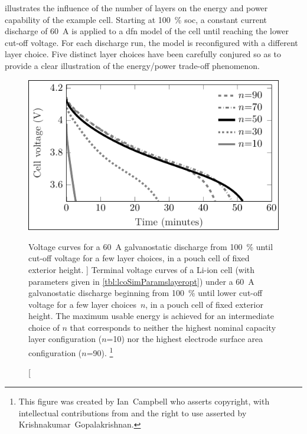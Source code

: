  illustrates  the influence  of the  number of
layers  on the  energy and  power capability  of the  example cell.  Starting at
\SI{100}{\percent} \gls{soc},  a constant current discharge  of \SI{60}{\ampere}
is applied  to a \gls{dfn}  model of the cell  until reaching the  lower cut-off
voltage. For  each discharge  run, the  model is  reconfigured with  a different
layer choice. Five distinct layer choices  have been carefully conjured so as to
provide a clear illustration of the energy/power trade-off phenomenon.

\begin{figure}[!bp]
    \begin{minipage}[t]{\textwidth}
        \centering
        \includegraphics[trim=4 4 2 4,clip]{fig_CC_discharge_curves.pdf}
        \captionsetup{labelsep=note}
        \caption
        [%
        Voltage curves for a \SI{60}{\ampere} galvanostatic discharge from
        \SI{100}{\percent}  until cut-off voltage for a few layer
        choices, in a pouch cell of fixed exterior height.
        ]%
        {%
            Terminal voltage curves of a Li-ion cell (with parameters
            given in \cref{tbl:lcoSimParamslayeropt}) under a \SI{60}{\ampere}
            galvanostatic discharge beginning from \SI{100}{\percent}
             until lower cut-off voltage for a few layer
            choices~$n$, in a pouch cell of fixed exterior height. The maximum
            usable energy is achieved for an intermediate choice of $n$
            that corresponds to neither the highest nominal capacity layer
            configuration ($n$=\num{10}) nor the highest electrode surface area
            configuration ($n$=\num{90}).
        }%
        \label{fig:fig_CC_discharge_curves}
        \mpfootnotes[1]
        \footnote{This figure was created by \mbox{Ian Campbell} who asserts copyright,
            with intellectual contributions from and the right to use asserted by
        \mbox{Krishnakumar Gopalakrishnan}.}
    \end{minipage}
\end{figure}

